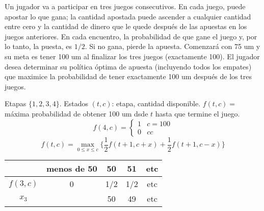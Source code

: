 \documentclass[twoside]{article}
\begin{document}
\newpage 
\begin{ejercicio}{6}\label{6}
Un jugador va a participar en tres juegos consecutivos. En cada juego, puede apostar lo que gana; la cantidad apostada puede ascender a cualquier cantidad entre cero y la cantidad de dinero que le quede después de las apuestas en los juegos anteriores. En cada encuentro, la probabilidad de que gane el juego y, por lo tanto, la puesta, es $1/2$. Si no gana, pierde la apuesta. Comenzará con 75 um y su meta es tener 100 um al finalizar los tres juegos (exactamente 100). El jugador desea determinar su política óptima de apuesta (incluyendo todos los empates) que maximice la probabilidad de tener exactamente 100 um después de los tres juegos.
\end{ejercicio}
\begin{solucion}
Etapas $\{1,2,3,4\}$. Estados $(t,c)$: etapa, cantidad disponible.
$f(t,c)=$ máxima probabilidad de obtener 100 um dsde $t$ hasta que termine el juego.
$$f(4,c)=\begin{cases}
1 & c=100\\
0 & cc
\end{cases}$$
$$f(t,c)=\max_{0\leq x\leq c}\{\frac{1}{2}f(t+1,c+x)+\frac{1}{2}f(t+1,c-x)\}$$
\begin{tabular}{c|cccc}
& menos de 50 & 50 & 51 & etc\\
\hline
$f(3,c)$ & 0 & 1/2 & 1/2 & etc\\
$x_3$    &   & 50 & 49 & etc
\end{tabular}


\end{solucion}
\end{document}
